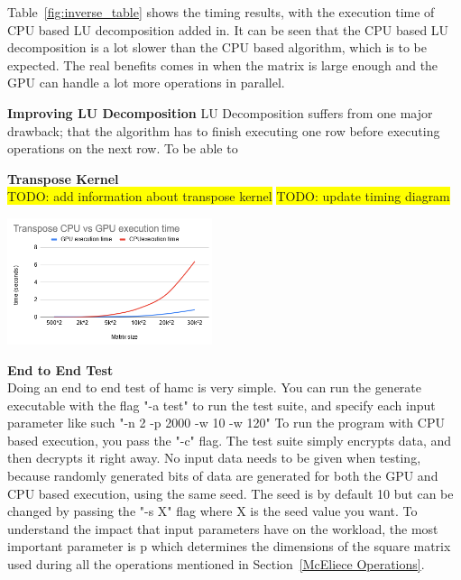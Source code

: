 \documentclass[conference]{IEEEtran}
\begin{document}
        Table~\ref{fig:inverse_table} shows the timing results, with the execution time of CPU based LU decomposition added in. It can be seen that the CPU based LU decomposition is a lot slower than the CPU based algorithm, which is to be expected. The real benefits comes in when the matrix is large enough and the GPU can handle a lot more operations in parallel.

        \textbf{Improving LU Decomposition} LU Decomposition suffers from one major drawback; that the algorithm has to finish executing one row before executing operations on the next row. To be able to 




        \textbf{Transpose Kernel}\label{Transpose Kernel}\\
            \colorbox{yellow}{TODO: add information about transpose kernel}
            \colorbox{yellow}{TODO: update timing diagram}
            \begin{center}
                \includegraphics[width=0.45\textwidth]{Transpose_timing.png}
                \label{fig:Transpose Timing}
            \end{center}

        \textbf{End to End Test}\label{End to End Test}\\
            Doing an end to end test of hamc is very simple. You can run the generate executable with the flag "-a test" to run the test suite, and specify each input parameter like such "-n 2 -p 2000 -w 10 -w 120" To run the program with CPU based execution, you pass the "-c" flag. The test suite simply encrypts data, and then decrypts it right away. No input data needs to be given when testing, because randomly generated bits of data are generated for both the GPU and CPU based execution, using the same seed. The seed is by default 10 but can be changed by passing the "-s X" flag where X is the seed value you want. To understand the impact that input parameters have on the workload, the most important parameter is p which determines the dimensions of the square matrix used during all the operations mentioned in Section~\ref{McEliece Operations}.
            
\end{document}
